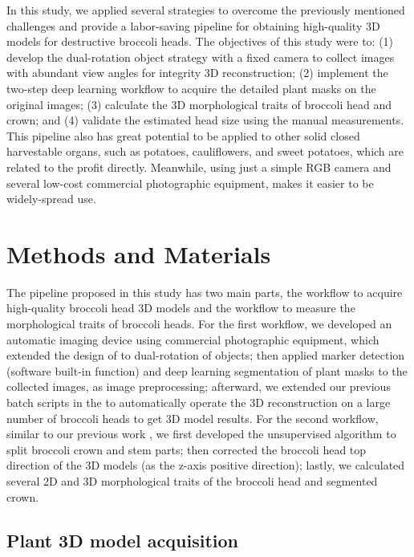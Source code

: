 In this study, we applied several strategies to overcome the previously mentioned challenges and provide a labor-saving pipeline for obtaining high-quality 3D models for destructive broccoli heads. The objectives of this study were to: (1) develop the dual-rotation object strategy with a fixed camera to collect images with abundant view angles for integrity 3D reconstruction; (2) implement the two-step deep learning workflow to acquire the detailed plant masks on the original images; (3) calculate the 3D morphological traits of broccoli head and crown; and (4) validate the estimated head size using the manual measurements. This pipeline also has great potential to be applied to other solid closed harvestable organs, such as potatoes, cauliflowers, and sweet potatoes, which are related to the profit directly. Meanwhile, using just a simple RGB camera and several low-cost commercial photographic equipment, makes it easier to be widely-spread use.


\section{Methods and Materials}

The pipeline proposed in this study has two main parts, the workflow to acquire high-quality broccoli head 3D models and the workflow to measure the morphological traits of broccoli heads. For the first workflow, we developed an automatic imaging device using commercial photographic equipment, which extended the design of \citet{kochi_3d_2018} to dual-rotation of objects; then applied marker detection (software built-in function) and deep learning segmentation of plant masks to the collected images, as image preprocessing; afterward, we extended our previous batch scripts in the \citet{feldman_easydcp_2021} to automatically operate the 3D reconstruction on a large number of broccoli heads to get 3D model results. For the second workflow, similar to our previous work \citep{feldman_easydcp_2021}, we first developed the unsupervised algorithm to split broccoli crown and stem parts; then corrected the broccoli head top direction of the 3D models (as the z-axis positive direction); lastly, we calculated several 2D and 3D morphological traits of the broccoli head and segmented crown.

\subsection{Plant 3D model acquisition}

